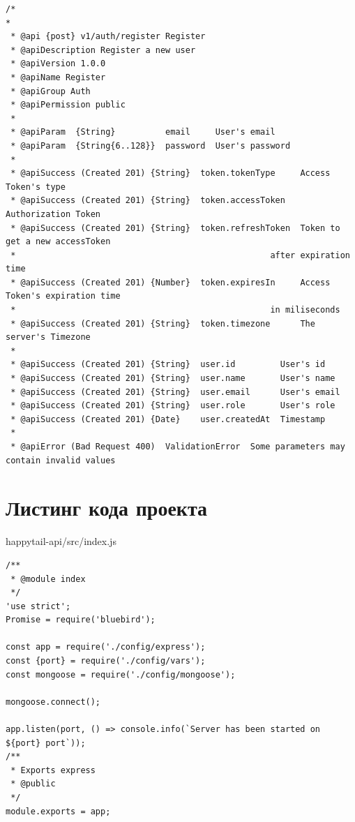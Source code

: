 \documentclass[12pt]{article}
\begin{document}
\footnotesize
\begin{verbatim}
/*
*
 * @api {post} v1/auth/register Register
 * @apiDescription Register a new user
 * @apiVersion 1.0.0
 * @apiName Register
 * @apiGroup Auth
 * @apiPermission public
 *
 * @apiParam  {String}          email     User's email
 * @apiParam  {String{6..128}}  password  User's password
 *
 * @apiSuccess (Created 201) {String}  token.tokenType     Access Token's type
 * @apiSuccess (Created 201) {String}  token.accessToken   Authorization Token
 * @apiSuccess (Created 201) {String}  token.refreshToken  Token to get a new accessToken
 *                                                   after expiration time
 * @apiSuccess (Created 201) {Number}  token.expiresIn     Access Token's expiration time
 *                                                   in miliseconds
 * @apiSuccess (Created 201) {String}  token.timezone      The server's Timezone
 *
 * @apiSuccess (Created 201) {String}  user.id         User's id
 * @apiSuccess (Created 201) {String}  user.name       User's name
 * @apiSuccess (Created 201) {String}  user.email      User's email
 * @apiSuccess (Created 201) {String}  user.role       User's role
 * @apiSuccess (Created 201) {Date}    user.createdAt  Timestamp
 *
 * @apiError (Bad Request 400)  ValidationError  Some parameters may contain invalid values

 \end{verbatim}
\newpage
 \section*{Листинг кода проекта}
  \normalsize
happytail-api/src/index.js
 \footnotesize
\begin{verbatim}
/**
 * @module index
 */
'use strict';
Promise = require('bluebird');

const app = require('./config/express');
const {port} = require('./config/vars');
const mongoose = require('./config/mongoose');

mongoose.connect();

app.listen(port, () => console.info(`Server has been started on ${port} port`));
/**
 * Exports express
 * @public
 */
module.exports = app;
 \end{verbatim}
 
\end{document}
